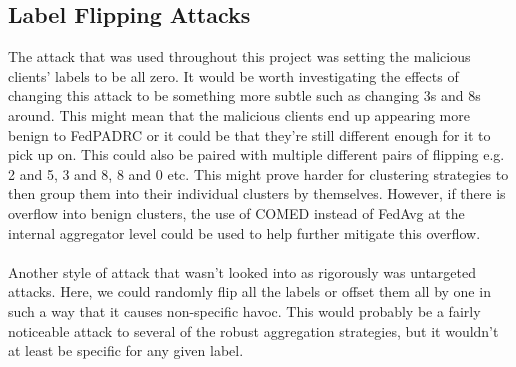 \subsection{Label Flipping Attacks}
The attack that was used throughout this project was setting the malicious clients' labels to be all zero.
It would be worth investigating the effects of changing this attack to be something more subtle such as changing 3s and 8s around.
This might mean that the malicious clients end up appearing more benign to FedPADRC or it could be that they're still different enough for it to pick up on.
This could also be paired with multiple different pairs of flipping e.g. 2 and 5, 3 and 8, 8 and 0 etc.
This might prove harder for clustering strategies to then group them into their individual clusters by themselves.
However, if there is overflow into benign clusters, the use of COMED instead of FedAvg at the internal aggregator level could be used to help further mitigate this overflow.
\\ \\
Another style of attack that wasn't looked into as rigorously was untargeted attacks.
Here, we could randomly flip all the labels or offset them all by one in such a way that it causes non-specific havoc.
This would probably be a fairly noticeable attack to several of the robust aggregation strategies, but it wouldn't at least be specific for any given label.


